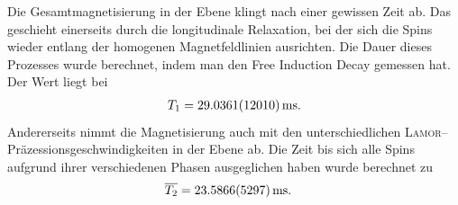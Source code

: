 \documentclass[10pt]{article}
\begin{document}
\begin{multicols}{2}
Die Gesamtmagnetisierung in der Ebene klingt nach einer gewissen Zeit ab.
Das geschieht einerseits durch die longitudinale Relaxation, bei der sich die Spins wieder entlang der homogenen Magnetfeldlinien ausrichten.
Die Dauer dieses Prozesses wurde berechnet, indem man den Free Induction Decay gemessen hat.
Der Wert liegt bei
\begin{align} 
        T_1=\SI{29.0361+-1.201}{ms}
.\end{align} 
Andererseits nimmt die Magnetisierung auch mit den unterschiedlichen \textsc{Lamor}--Präzessionsgeschwindigkeiten in der Ebene ab.
Die Zeit bis sich alle Spins aufgrund ihrer verschiedenen Phasen ausgeglichen haben wurde berechnet zu
\begin{align} 
        \overline{T_2}&=\SI{23.5866+-0.5297}{ms}
.\end{align} 


\end{multicols}
\printbibliography
\end{document}
